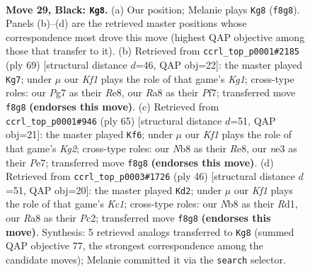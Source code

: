 \documentclass[11pt]{article}
\begin{document}
\clearpage

\begin{figure}[p]\centering
\begin{subfigure}{0.46\textwidth}\centering
\resizebox{\linewidth}{!}{%
\newchessgame
\chessboard[
  setfen={rn3k2/p5pp/4pp2/2R4P/PP6/4Nb2/8/R1K5 b - - 1 29},
  showmover=false,
  pgfstyle=straightmove, color=movearrow, markmove={f8-g8}
]}
\caption{}
\end{subfigure}\hfill
\begin{subfigure}{0.46\textwidth}\centering
\resizebox{\linewidth}{!}{%
\newchessgame
\chessboard[
  setfen={4r1k1/5p2/3p1p1p/1P6/4p1P1/2r1P2P/8/R3R1K1 b - - 0 35},
  showmover=false,
  pgfstyle=straightmove, color=movearrow, markmove={g8-g7}
]}
\caption{}
\end{subfigure}
\\[4pt]
\begin{subfigure}{0.46\textwidth}\centering
\resizebox{\linewidth}{!}{%
\newchessgame
\chessboard[
  setfen={1r2r3/4p1k1/3p2p1/5p2/1p1N4/1P2P2p/P7/R1R4K b - - 1 33},
  showmover=false,
  pgfstyle=straightmove, color=movearrow, markmove={g7-f6}
]}
\caption{}
\end{subfigure}\hfill
\begin{subfigure}{0.46\textwidth}\centering
\resizebox{\linewidth}{!}{%
\newchessgame
\chessboard[
  setfen={4r3/2k1r2p/p7/2p5/1p3P2/3B4/PPP3PP/2KR4 w - - 0 24},
  showmover=false,
  pgfstyle=straightmove, color=movearrow, markmove={c1-d2}
]}
\caption{}
\end{subfigure}
\caption{\textbf{Move 29, Black: \texttt{Kg8}.} (a) Our position; Melanie plays \texttt{Kg8} (\texttt{f8g8}). Panels (b)--(d) are the retrieved master positions whose correspondence most drove this move (highest QAP objective among those that transfer to it). (b) Retrieved from \texttt{ccrl\_top\_p0001\#2185} (ply 69) [structural distance $d$=46, QAP obj=22]: the master played \texttt{Kg7}; under $\mu$ our \emph{Kf1} plays the role of that game's \emph{Kg1}; cross-type roles: our \emph{P}g7 as their \emph{R}e8, our \emph{R}a8 as their \emph{P}f7; transferred move \texttt{f8g8} \textbf{(endorses this move)}. (c) Retrieved from \texttt{ccrl\_top\_p0001\#946} (ply 65) [structural distance $d$=51, QAP obj=21]: the master played \texttt{Kf6}; under $\mu$ our \emph{Kf1} plays the role of that game's \emph{Kg2}; cross-type roles: our \emph{N}b8 as their \emph{R}e8, our \emph{n}e3 as their \emph{P}e7; transferred move \texttt{f8g8} \textbf{(endorses this move)}. (d) Retrieved from \texttt{ccrl\_top\_p0003\#1726} (ply 46) [structural distance $d$=51, QAP obj=20]: the master played \texttt{Kd2}; under $\mu$ our \emph{Kf1} plays the role of that game's \emph{Kc1}; cross-type roles: our \emph{N}b8 as their \emph{R}d1, our \emph{R}a8 as their \emph{P}c2; transferred move \texttt{f8g8} \textbf{(endorses this move)}. Synthesis: 5 retrieved analogs transferred to \texttt{Kg8} (summed QAP objective 77, the strongest correspondence among the candidate moves); Melanie committed it via the \texttt{search} selector.}
\label{fig:thought-m57}
\end{figure}
\end{document}
